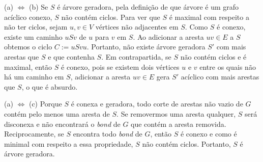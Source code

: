 (a) $\Leftrightarrow$ (b) Se $S$ é árvore geradora, pela definição de que árvore
é um grafo acíclico conexo, $S$ não contém ciclos. Para ver que $S$ é maximal com
respeito a não ter ciclos, sejam $u,v \in V$ vértices não adjacentes em $S$. Como
$S$ é conexo, existe um caminho $uSv$ de $u$ para $v$ em $S$. Ao adicionar a aresta
$uv \in E$ a $S$ obtemos o ciclo $C:= uSvu$. Portanto, não existe árvore geradora
$S'$ com mais arestas que $S$ e que contenha $S$. Em contrapartida, se $S$ não
contém ciclos e é maximal, então $S$ é conexo, pois se existem dois vértices $u$
e $v$ entre os quais não há um caminho em $S$, adicionar a aresta $uv \in E$ gera
$S'$ acíclico com mais arestas que $S$, o que é absurdo.

(a) $\Leftrightarrow$ (c) Porque $S$ é conexa e geradora, todo corte de arestas
não vazio de $G$ contém pelo menos uma aresta de $S$. Se removermos uma aresta
qualquer, $S$ será disconexa e não encontrará o \emph{bond} de $G$ que contém a
aresta removida. Reciprocamente, se $S$ encontra todo \emph{bond} de $G$, então
$S$ é conexo e como é minimal com respeito a essa propriedade, $S$ não contém
ciclos. Portanto, $S$ é árvore geradora.
\fimprova

